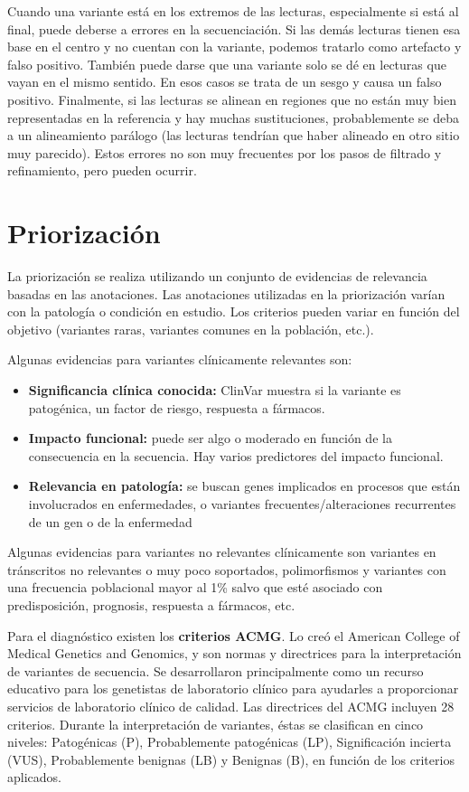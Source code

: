Cuando una variante está en los extremos de las lecturas, especialmente si está al final, puede deberse a errores en la secuenciación. Si las demás lecturas tienen esa base en el centro y no cuentan con la variante, podemos tratarlo como artefacto y falso positivo. También puede darse que una variante solo se dé en lecturas que vayan en el mismo sentido. En esos casos se trata de un sesgo y causa un falso positivo. Finalmente, si las lecturas se alinean en regiones que no están muy bien representadas en la referencia y hay muchas sustituciones, probablemente se deba a un alineamiento parálogo (las lecturas tendrían que haber alineado en otro sitio muy parecido). Estos errores no son muy frecuentes por los pasos de filtrado y refinamiento, pero pueden ocurrir. 

\section{Priorización}
La priorización se realiza utilizando un conjunto de evidencias de relevancia basadas en las anotaciones. Las anotaciones utilizadas en la priorización varían con la patología o condición en estudio. Los criterios pueden variar en función del objetivo (variantes raras, variantes comunes en la población, etc.).

Algunas evidencias para variantes clínicamente relevantes son:
\begin{itemize}
\item \textbf{Significancia clínica conocida:} ClinVar muestra si la variante es patogénica, un factor de riesgo, respuesta a fármacos.
\item \textbf{Impacto funcional:} puede ser algo o moderado en función de la consecuencia en la secuencia. Hay varios predictores del impacto funcional.
\item \textbf{Relevancia en patología:} se buscan genes implicados en procesos que están involucrados en enfermedades, o variantes frecuentes/alteraciones recurrentes de un gen o de la enfermedad
\end{itemize}

Algunas evidencias para variantes no relevantes clínicamente son variantes en tránscritos no relevantes o muy poco soportados, polimorfismos y variantes con una frecuencia poblacional mayor al 1\% salvo que esté asociado con predisposición, prognosis, respuesta a fármacos, etc.

Para el diagnóstico existen los \textbf{criterios ACMG}. Lo creó el American College of Medical Genetics and Genomics, y son normas y directrices para la interpretación de variantes de secuencia.
Se desarrollaron principalmente como un recurso educativo para los genetistas de laboratorio clínico para ayudarles a proporcionar servicios de laboratorio clínico de calidad. Las directrices del ACMG incluyen 28 criterios. Durante la interpretación de variantes, éstas se clasifican en cinco niveles: Patogénicas (P), Probablemente patogénicas (LP), Significación incierta (VUS), Probablemente benignas (LB) y Benignas (B), en función de los criterios aplicados.

